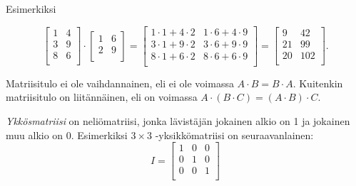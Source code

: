 \begin{center}
\end{center}

Esimerkiksi

\[
 \begin{bmatrix}
  1 & 4 \\
  3 & 9 \\
  8 & 6 \\
 \end{bmatrix}
\cdot
 \begin{bmatrix}
  1 & 6 \\
  2 & 9 \\
 \end{bmatrix}
=
 \begin{bmatrix}
  1 \cdot 1 + 4 \cdot 2 & 1 \cdot 6 + 4 \cdot 9 \\
  3 \cdot 1 + 9 \cdot 2 & 3 \cdot 6 + 9 \cdot 9 \\
  8 \cdot 1 + 6 \cdot 2 & 8 \cdot 6 + 6 \cdot 9 \\
 \end{bmatrix}
=
 \begin{bmatrix}
  9 & 42 \\
  21 & 99 \\
  20 & 102 \\
 \end{bmatrix}.
\]

Matriisitulo ei ole vaihdannainen,
eli ei ole voimassa $A \cdot B = B \cdot A$.
Kuitenkin matriisitulo
on liitännäinen, eli on voimassa $A \cdot (B \cdot C)=(A \cdot B) \cdot C$.

\textit{Ykkösmatriisi} on neliömatriisi,
jonka lävistäjän jokainen alkio on 1
ja jokainen muu alkio on 0.
Esimerkiksi $3 \times 3$ -yksikkömatriisi on
seuraavanlainen:
\[
 I = \begin{bmatrix}
  1 & 0 & 0 \\
  0 & 1 & 0 \\
  0 & 0 & 1 \\
 \end{bmatrix}
\]

